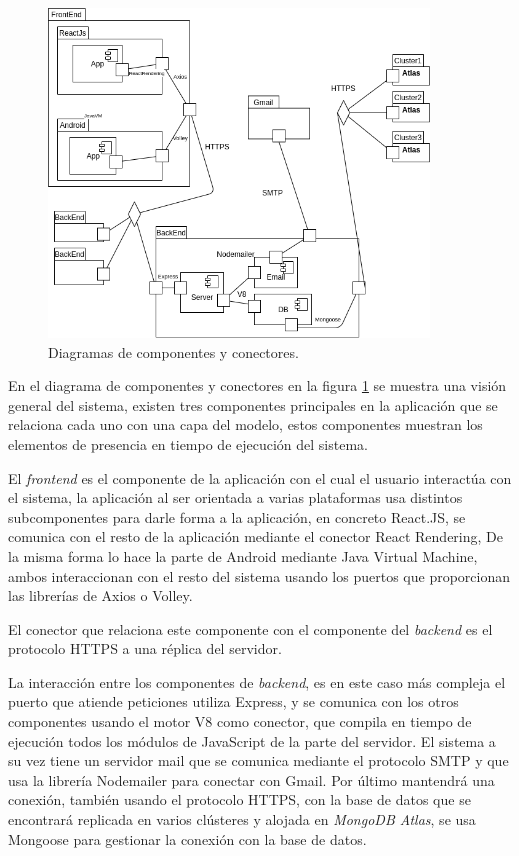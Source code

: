 \documentclass{article}
\begin{document}
\begin{figure}[H]
    \centering
        \includegraphics[width=0.90\textwidth]{../images/cyc.png}
    \caption{Diagramas de componentes y conectores.}
    \label{cyc}
\end{figure}

En el diagrama de componentes y conectores en la figura \ref{cyc} se muestra una visión general del sistema, existen tres componentes principales en la aplicación que se relaciona cada uno con una capa del modelo, estos componentes muestran los elementos de presencia en tiempo de ejecución del sistema.

El \textit{frontend} es el componente de la aplicación con el cual el usuario interactúa con el sistema, la aplicación al ser orientada a varias plataformas usa distintos subcomponentes para darle forma a la aplicación, en concreto React.JS, se comunica con el resto de la aplicación mediante el conector React Rendering, De la misma forma lo hace la parte de Android mediante Java Virtual Machine, ambos interaccionan con el resto del sistema usando los puertos que proporcionan las librerías de Axios o Volley.

El conector que relaciona este componente con el componente del \textit{backend} es el protocolo HTTPS a una réplica del servidor.

La interacción entre los componentes de \textit{backend}, es en este caso más compleja el puerto que atiende peticiones utiliza Express, y se comunica con los otros componentes usando el motor V8 como conector, que compila en tiempo de ejecución todos los módulos de JavaScript de la parte del servidor. El sistema a su vez tiene un servidor mail que se comunica mediante el protocolo SMTP y que usa la librería Nodemailer para conectar con Gmail. Por último mantendrá una conexión, también usando el protocolo HTTPS, con la base de datos que se encontrará replicada en varios clústeres y alojada en \textit{MongoDB Atlas}, se usa Mongoose para gestionar la conexión con la base de datos.
\end{document}
